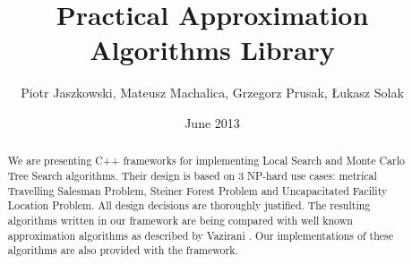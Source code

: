 \documentclass[licencjacka]{pracamgr}
\author{Piotr Jaszkowski, Mateusz Machalica, Grzegorz Prusak, Łukasz Solak}
\title{Practical Approximation Algorithms Library}
\date{June 2013}
\begin{document}
\maketitle

\begin{abstract}
  We are presenting C++ frameworks for implementing Local Search
  and Monte Carlo Tree Search algorithms. Their design is based
  on 3 NP-hard use cases: metrical Travelling Salesman Problem,
  Steiner Forest Problem and Uncapacitated Facility Location Problem.
  All design decisions are thoroughly justified. The resulting
  algorithms written in our framework are being compared with
  well known approximation algorithms as described by Vazirani \cite{Vazirani}.
  Our implementations of these algorithms are also provided with the framework.
\end{abstract}

\tableofcontents

\newpage
\end{document}
